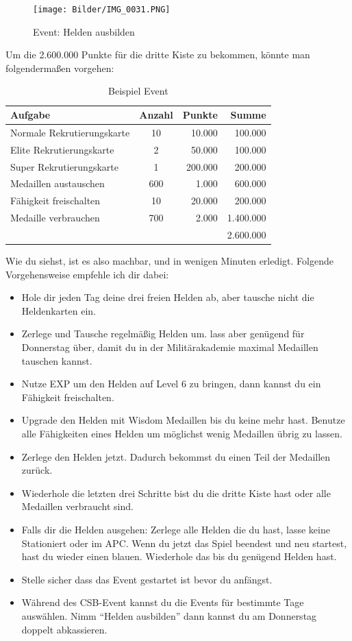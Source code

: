 \documentclass[fontsize=12pt,a4paper]{scrartcl}[2003/01/01]
\begin{document}
\begin{figure}[H] 
  \centering
     \texttt{[image: Bilder/IMG\_0031.PNG]}
  \caption{Event: Helden ausbilden}
  \label{fig:helden}
\end{figure}

Um die 2.600.000 Punkte für die dritte Kiste zu bekommen, könnte man folgendermaßen vorgehen:

\begin{table}[h!]
  \centering
    \begin{tabularx}{0.7\textwidth}{lcrr}
      Aufgabe & Anzahl & Punkte & Summe \\
      \hline
      Normale Rekrutierungskarte & 10 & 10.000 & 100.000 \\
      Elite Rekrutierungskarte & 2 & 50.000 & 100.000 \\
      Super Rekrutierungskarte & 1 & 200.000 & 200.000 \\
      Medaillen austauschen & 600 & 1.000 & 600.000 \\
      Fähigkeit freischalten & 10 & 20.000 & 200.000 \\
      Medaille verbrauchen & 700 & 2.000 & 1.400.000 \\
      \hline
      ~ & ~ & ~ & 2.600.000 \\
    \end{tabularx}
  \caption[Event]{Beispiel Event}
\end{table}

Wie du siehst, ist es also machbar, und in wenigen Minuten erledigt.
Folgende Vorgehensweise empfehle ich dir dabei:

\begin{itemize}
  \item Hole dir jeden Tag deine drei freien Helden ab, aber tausche nicht die Heldenkarten ein.
  \item Zerlege und Tausche regelmäßig Helden um. lass aber genügend für Donnerstag über, damit du in der Militärakademie maximal Medaillen tauschen kannst.
  \item Nutze EXP um den Helden auf Level 6 zu bringen, dann kannst du ein Fähigkeit freischalten.
  \item Upgrade den Helden mit Wisdom Medaillen bis du keine mehr hast. Benutze alle Fähigkeiten eines Helden um möglichst wenig Medaillen übrig zu lassen.
  \item Zerlege den Helden jetzt. Dadurch bekommst du einen Teil der Medaillen zurück.
  \item Wiederhole die letzten drei Schritte bist du die dritte Kiste hast oder alle Medaillen verbraucht sind.
  \item Falls dir die Helden ausgehen: Zerlege alle Helden die du hast, lasse keine Stationiert oder im APC. 
        Wenn du jetzt das Spiel beendest und neu startest, hast du wieder einen blauen. Wiederhole das bis du genügend Helden hast.
  \item Stelle sicher dass das Event gestartet ist bevor du anfängst.
  \item Während des CSB-Event kannst du die Events für bestimmte Tage auswählen. Nimm "`Helden ausbilden"' dann kannst du am Donnerstag doppelt abkassieren.
\end{itemize}	
\end{document}
